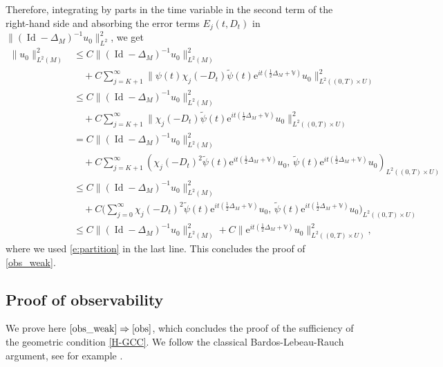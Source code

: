 \documentclass[10pt]{amsart}
\newcommand{\rme}{\mathrm{e}}
\DeclareMathOperator{\Id}{Id}
\theoremstyle{plain}
\theoremstyle{definition}
\def\bbV{{\mathbb V}}
\begin{document}
Therefore, integrating by parts in the time variable in the second term of the right-hand side and absorbing the error terms $E_j(t,D_t)$ in $\|(\Id-\Delta_M)^{-1}u_0\|^2_{L^2}$, we get
\begin{align*}
\|u_0\|_{L^2(M)}^2&\leq C\|(\Id-\Delta_M)^{-1}u_0\|^2_{L^2(M)}\\
&\quad+C\sum_{j=K+1}^\infty \|\psi(t)\chi_j(-D_t)\widetilde{\psi}(t) \rme^{it(\frac12 \Delta_M+\bbV)} u_0\|_{L^2((0,T)\times U)}^2 \\
&\leq C\|(\Id-\Delta_M)^{-1}u_0\|^2_{L^2(M)}\\
&\quad+C\sum_{j=K+1}^\infty \|\chi_j(-D_t)\widetilde{\psi}(t) \rme^{it(\frac12 \Delta_M+\bbV)} u_0\|_{L^2((0,T)\times U)}^2 \\
&= C\|(\Id-\Delta_M)^{-1}u_0\|^2_{L^2(M)}\\
&\quad+C\sum_{j=K+1}^\infty \left(\chi_j(-D_t)^2\widetilde{\psi}(t) \rme^{it(\frac12 \Delta_M+\bbV)} u_0,\,\widetilde{\psi}(t) \rme^{it(\frac12 \Delta_M+\bbV)} u_0\right)_{L^2((0,T)\times U)} \\
&\leq C\|(\Id-\Delta_M)^{-1}u_0\|^2_{L^2(M)}\\
&\quad+C \biggl(\sum_{j=0}^\infty \chi_j(-D_t)^2 \widetilde{\psi}(t) \rme^{it(\frac12 \Delta_M+\bbV)} u_0,\, \widetilde{\psi}(t) \rme^{it(\frac12 \Delta_M+\bbV)} u_0 \biggr)_{L^2((0,T)\times U)} \\
&\leq C\|(\Id-\Delta_M)^{-1}u_0\|^2_{L^2(M)}+C\| \rme^{it(\frac12 \Delta_M+\bbV)} u_0\|^2_{L^2((0,T)\times U)},
\end{align*}
where we used \eqref{e:partition} in the last line. This concludes the proof of \eqref{obs_weak}.

\subsection{Proof of observability} \label{s:fromweaktostrongobs}

We prove here $\eqref{obs_weak} \Rightarrow\eqref{obs}$, which concludes the proof of the sufficiency of the geometric condition \eqref{H-GCC}. We follow the classical Bardos-Lebeau-Rauch argument, see for example \cite{BZ}.
\end{document}
